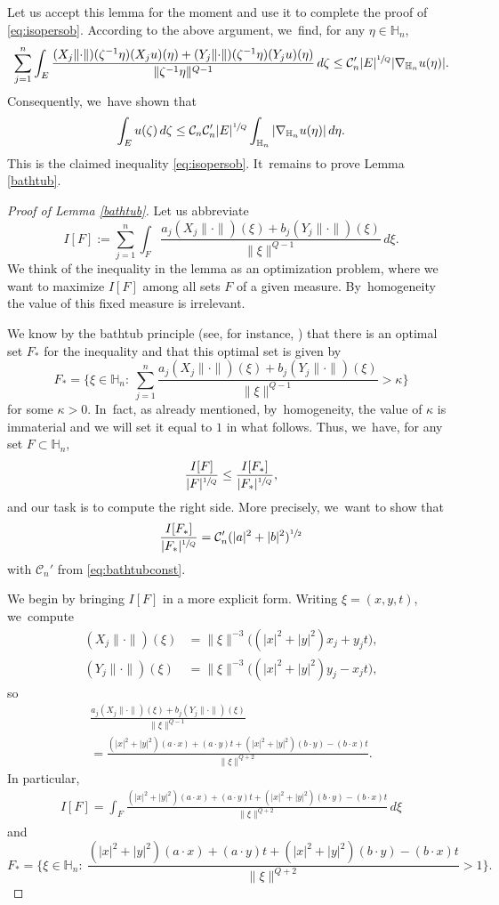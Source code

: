 \documentclass[11pt]{article}
\let\oldsfrac\sfrac
\renewcommand{\sfrac}[2]{{\oldsfrac{#1}{#2}}}
\theoremstyle{definition}
\newcommand{\1}{\mathbbm{1}}
\numberwithin{equation}{section}
\begin{document}
Let us accept this lemma for the moment and use it to complete the proof of \eqref{eq:isopersob}. According to the above argument, we~find, for any $\eta\in\mathbb H_n$,
\[
\sum_{j=1}^n \int_E \frac{(X_j\|{\cdot}\|)(\zeta^{-1} \eta) (X_ju)(\eta) + (Y_j\|{\cdot}\|)(\zeta^{-1}\eta) (Y_ju)(\eta)}{\|\zeta^{-1} \eta\|^{Q-1}}\,d\zeta
\leq \mathcal C_n' |E|^\sfrac1Q |\nabla_{\mathbb H_n} u(\eta)|.
\]
Consequently, we~have shown that
\[
\int_E u(\zeta)\,d\zeta \leq \mathcal C_n \mathcal C_n' |E|^\sfrac1Q \int_{\mathbb H_n} |\nabla_{\mathbb H_n} u(\eta)| \,d\eta.
\]
This is the claimed inequality \eqref{eq:isopersob}. It~remains to prove Lemma \ref{bathtub}.

\begin{proof}[Proof of Lemma \ref{bathtub}]
Let us abbreviate
\[
I[F] := \sum_{j=1}^n \int_F \frac{a_j (X_j\|{\cdot}\|)(\xi) + b_j (Y_j\|{\cdot}\|)(\xi)}{\|\xi\|^{Q-1}}\,d\xi.
\]
We think of the inequality in the lemma as an optimization problem, where we want to maximize $I[F]$ among all sets $F$ of a given measure. By~homogeneity the value of this fixed measure is irrelevant.

We know by the bathtub principle (see, for instance, \cite[Th.\,1.14]{LiLo}) that there is an optimal set $F_*$ for the inequality and that this optimal set is given by
\[
F_* = \biggl\{ \xi \in \mathbb H_n :\ \sum_{j=1}^n \frac{a_j (X_j\|{\cdot}\|)(\xi) + b_j (Y_j\|{\cdot}\|)(\xi)}{\|\xi\|^{Q-1}} >\kappa \biggr\}
\]
for some $\kappa>0$. In~fact, as already mentioned, by~homogeneity, the value of $\kappa$ is immaterial and we will set it equal to $1$ in what follows.
Thus, we~have, for any set $F\subset\mathbb H_n$,
\[
\frac{I[F]}{|F|^\sfrac1Q} \leq \frac{I[F_*]}{|F_*|^\sfrac1Q},
\]
and our task is to compute the right side. More precisely, we~want to show that
\[
\frac{I[F_*]}{|F_*|^\sfrac1Q} = \mathcal C_n' (|a|^2 + |b|^2)^{\sfrac12}
\]
with $\mathcal C_n'$ from \eqref{eq:bathtubconst}.

We begin by bringing $I[F]$ in a more explicit form. Writing $\xi=(x,y,t)$, we~compute
\begin{align*}
(X_j\|{\cdot}\|)(\xi) & = \|\xi\|^{-3} \bigl((|x|^2+|y|^2) x_j + y_j t\bigr),\\
(Y_j\|{\cdot}\|)(\xi) & = \|\xi\|^{-3} \bigl((|x|^2+|y|^2) y_j - x_j t\bigr),
\end{align*}
so
\begin{multline*}
\frac{a_j (X_j\|{\cdot}\|)(\xi) + b_j (Y_j\|{\cdot}\|)(\xi)}{\|\xi\|^{Q-1}} \\[-8pt]
= \frac{(|x|^2+|y|^2)(a\cdot x) + (a\cdot y)t + (|x|^2+|y|^2)(b\cdot y) - (b\cdot x)t}{\|\xi\|^{Q+2}}.
\end{multline*}
In particular,
\begin{align*}
I[F] = \int_F \frac{(|x|^2+|y|^2)(a\cdot x) + (a\cdot y)t + (|x|^2+|y|^2)(b\cdot y) - (b\cdot x)t}{\|\xi\|^{Q+2}}\,d\xi
\end{align*}
and
\[
F_* = \biggl\{ \xi\in\mathbb H_n:\ \frac{(|x|^2+|y|^2)(a\cdot x) + (a\cdot y)t + (|x|^2+|y|^2)(b\cdot y) - (b\cdot x)t}{\|\xi\|^{Q+2}} > 1\biggr\}.
\]


\end{proof}
\end{document}
